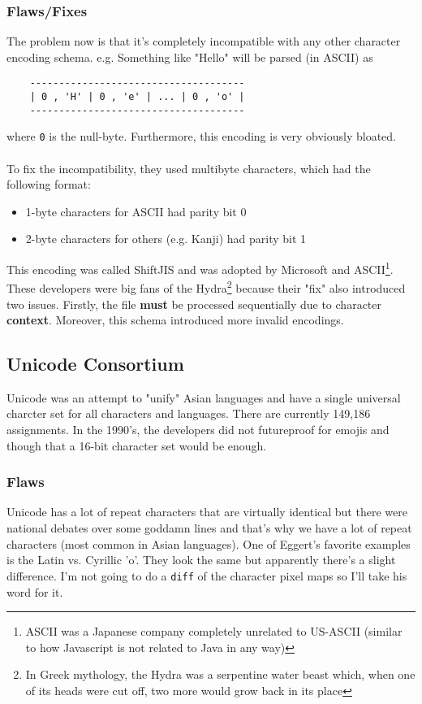 \documentclass[13pt]{article}
\begin{document}
\subsubsection{Flaws/Fixes}
The problem now is that it's completely incompatible with any other character encoding schema. e.g. Something like "Hello" will be parsed (in ASCII) as
\begin{verbatim}
    -------------------------------------
    | 0 , 'H' | 0 , 'e' | ... | 0 , 'o' |
    -------------------------------------
\end{verbatim}
where \texttt{0} is the null-byte. Furthermore, this encoding is very obviously bloated. \\ \\
To fix the incompatibility, they used multibyte characters, which had the following format:
\begin{itemize}[label=]
\item 1-byte characters for ASCII had parity bit 0
\item 2-byte characters for others (e.g. Kanji) had parity bit 1
\end{itemize}
This encoding was called ShiftJIS and was adopted by Microsoft and ASCII\footnote{ASCII was a Japanese company completely unrelated to US-ASCII (similar to how Javascript is not related to Java in any way)}. These developers were big fans of the Hydra\footnote{In Greek mythology, the Hydra was a serpentine water beast which, when one of its heads were cut off, two more would grow back in its place} because their "fix" also introduced two issues. Firstly, the file \textbf{must} be processed sequentially due to character \textbf{context}. Moreover, this schema introduced more invalid encodings.





\subsection{Unicode Consortium}
Unicode was an attempt to "unify" Asian languages and have a single universal charcter set for all characters and languages. There are currently 149,186 assignments. In the 1990's, the developers did not futureproof for emojis and though that a 16-bit character set would be enough.

\subsubsection{Flaws}
Unicode has a lot of repeat characters that are virtually identical but there were national debates over some goddamn lines and that's why we have a lot of repeat characters (most common in Asian languages). One of Eggert's favorite examples is the Latin vs. Cyrillic 'o'. They look the same but apparently there's a slight difference. I'm not going to do a \texttt{diff} of the character pixel maps so I'll take his word for it.
\end{document}
